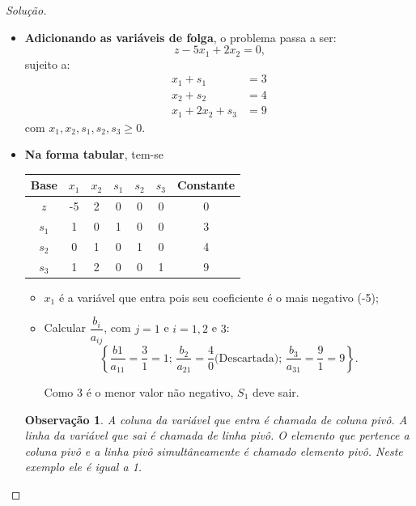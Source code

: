 \documentclass[
	12pt,				%
	openright,			%
	twoside,			%
	a4paper,			%
	english,			%
	french,				%
	brazil,				%
	sumario=tradicional
]{abntex2}
\newtheorem{remark}{Observação}
\newenvironment{solution}{
	\begin{proof}[Solução]
}{\end{proof}}
\numberwithin{example}{chapter}
\numberwithin{remark}{chapter}
\numberwithin{definition}{chapter}
\numberwithin{figure}{chapter}
\begin{document}
\begin{solution}\hfill
	\begin{itemize}
		\item \textbf{Adicionando as variáveis de folga}, o problema passa a ser:
		$$z-5x_1+2x_2=0\text{,}$$
		sujeito a:
		\begin{align*}
			x_1 + s_1 & = 3\\
			x_2 + s_2 & = 4\\
			x_1 + 2x_2 + s_3 & = 9
		\end{align*}
		com $x_1, x_2, s_1, s_2, s_3 \geqslant 0$.
		
		\item \textbf{Na forma tabular}, tem-se
		\begin{table}[h]
			\centering
			\begin{tabular}{|c|c|c|c|c|c|c|}
				\hline
				Base & $x_1$ & $x_2$ & $s_1$ & $s_2$ & $s_3$ & Constante \\
		        \hline
		        $z$ & -5 & 2 & 0 & 0 & 0 & 0\\
		        \hline
		        $s_1$ & 1 & 0 & 1 & 0 & 0 & 3\\
		        \hline
		        $s_2$ & 0 & 1 & 0 & 1 & 0 & 4\\
		        \hline
		        $s_3$ & 1 & 2 & 0 & 0 & 1 & 9\\
		        \hline
			\end{tabular}
		\end{table}
		
		\begin{itemize}
			\item $x_1$ é a variável que entra pois seu coeficiente é o mais negativo (-5);
			
			\item Calcular $\dfrac{b_i}{a_{ij}}$, com $j=1$ e $i=1,2$ e $3$: 
			$$\left \{ \dfrac{b1}{a_{11}}=\dfrac{3}{1}=1\text{; } \dfrac{b_2}{a_{21}}=\dfrac{4}{0}\text{(Descartada); } \dfrac{b_3}{a_{31}}=\dfrac{9}{1}=9 \right \}\text{.}$$
			
			Como $3$ é o menor valor não negativo, $S_1$ deve sair.
		\end{itemize}
		
		\begin{remark}
			A coluna da variável que entra é chamada de coluna pivô. A linha da variável que sai é chamada de linha pivô. O elemento que pertence a coluna pivô e a linha pivô simultâneamente é chamado elemento pivô. Neste exemplo ele é igual a 1.
		\end{remark}
		

\end{itemize}
\end{solution}
\end{document}
